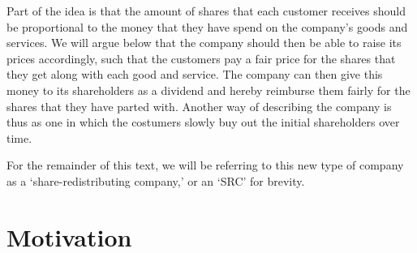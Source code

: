 \documentclass{article}
\begin{document}
Part of the idea is that the amount of shares that each customer receives should be proportional to the money that they have %
spend on the company's goods and services. We will argue below that the company should then be able to raise its prices accordingly, such that the customers pay a fair price for the shares that they get along with each good and service. The company can then give this money to its shareholders as a dividend and hereby reimburse them fairly for the shares that they have parted with. 
%
Another way of describing the company is thus as one in which the costumers slowly buy out the initial shareholders over time.

For the remainder of this text, we will be referring to this new type of company as a `share-redistributing company,' or an `SRC' for brevity. 







\section{Motivation}
\end{document}
